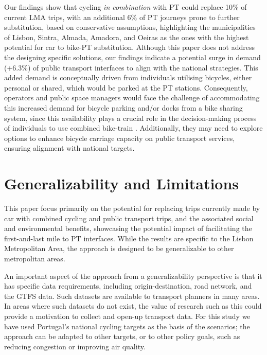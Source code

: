 \documentclass[review, doubleblind, 3p,
authoryear]{elsarticle} %
\begin{document}
Our findings show that cycling \emph{in combination} with PT could
replace 10\% of current LMA trips, with an additional 6\% of PT journeys
prone to further substitution, based on conservative assumptions,
highlighting the municipalities of Lisbon, Sintra, Almada, Amadora, and
Oeiras as the ones with the highest potential for car to bike-PT
substitution. Although this paper does not address the designing
specific solutions, our findings indicate a potential surge in demand
(+6.3\%) of public transport interfaces to align with the national
strategies. This added demand is conceptually driven from individuals
utilising bicycles, either personal or shared, which would be parked at
the PT stations. Consequently, operators and public space managers would
face the challenge of accommodating this increased demand for bicycle
parking and/or docks from a bike sharing system, since this availability
plays a crucial role in the decision-making process of individuals to
use combined bike-train \citep{jonkeren2021bicycle}. Additionally, they
may need to explore options to enhance bicycle carriage capacity on
public transport services, ensuring alignment with national targets.

\section{Generalizability and
Limitations}\label{generalizability-and-limitations}

This paper focus primarily on the potential for replacing trips
currently made by car with combined cycling and public transport trips,
and the associated social and environmental benefits, showcasing the
potential impact of facilitating the first-and-last mile to PT
interfaces. While the results are specific to the Lisbon Metropolitan
Area, the approach is designed to be generalizable to other metropolitan
areas.

An important aspect of the approach from a generalizability perspective
is that it has specific data requirements, including origin-destination,
road network, and the GTFS data. Such datasets are available to
transport planners in many areas. In areas where such datasets do not
exist, the value of research such as this could provide a motivation to
collect and open-up transport data. For this study we have used
Portugal's national cycling targets as the basis of the scenarios; the
approach can be adapted to other targets, or to other policy goals, such
as reducing congestion or improving air quality.
\end{document}

